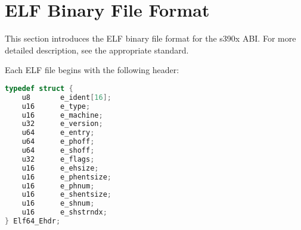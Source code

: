\section{ELF Binary File Format}
This section introduces the ELF binary file format for the s390x ABI.  For
more detailed description, see the appropriate standard.

Each ELF file begins with the following header:

\begin{lstlisting}[language=C]
typedef struct {
	u8       e_ident[16];
	u16      e_type;
	u16      e_machine;
	u32      e_version;
	u64      e_entry;
	u64      e_phoff;
	u64      e_shoff;
	u32      e_flags;
	u16      e_ehsize;
	u16      e_phentsize;
	u16      e_phnum;
	u16      e_shentsize;
	u16      e_shnum;
	u16      e_shstrndx;
} Elf64_Ehdr;
\end{lstlisting}


